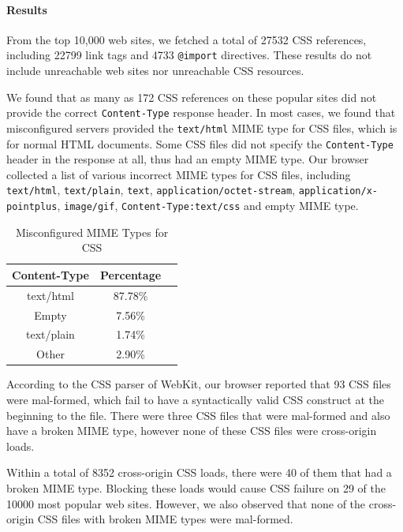 \documentclass{acm_proc_article-sp}
\begin{document}
{\paragraph{Results}
From the top 10,000 web sites, we fetched a total of 27532 CSS references, including 22799 link tags and 4733 \texttt{@import} directives. These results do not include unreachable web sites nor unreachable CSS resources.

We found that as many as 172 CSS references on these popular sites did not provide the correct \texttt{Content-Type} response header. In most cases, we found that misconfigured servers provided the \texttt{text/html} MIME type for CSS files, which is for normal HTML documents. Some CSS files did not specify the \texttt{Content-Type} header in the response at all, thus had an empty MIME type. Our browser collected a list of various incorrect MIME types for CSS files, including \texttt{text/html}, \texttt{text/plain}, \texttt{text}, \texttt{application/octet-stream}, \texttt{application/x-pointplus}, \texttt{image/gif}, \texttt{Content-Type:text/css} and empty MIME type.

\begin{table}
\centering
\begin{tabular}{|c|c|c|} \hline
Content-Type&Percentage\\ \hline
text/html&87.78\%\\ \hline
Empty&7.56\%\\ \hline
text/plain&1.74\%\\ \hline
Other&2.90\%\\
\hline\end{tabular}
\caption{Misconfigured MIME Types for CSS}
\end{table}

According to the CSS parser of WebKit, our browser reported that 93 CSS files were mal-formed, which fail to have a syntactically valid CSS construct at the beginning to the file. There were three CSS files that were mal-formed and also have a broken MIME type, however none of these CSS files were cross-origin loads.

Within a total of 8352 cross-origin CSS loads, there were 40 of them that had a broken MIME type. Blocking these loads would cause CSS failure on 29 of the 10000 most popular web sites. However, we also observed that none of the cross-origin CSS files with broken MIME types were mal-formed.


}
\end{document}
